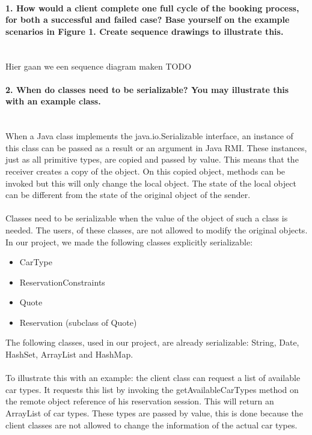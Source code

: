 \documentclass{ds-report}
\begin{document}
	\maketitle

	\paragraph{1. How would a client complete one full cycle of the booking process, for both a successful and
failed case? Base yourself on the example scenarios in Figure 1. Create sequence drawings to
illustrate this.} \mbox{}\\
	Hier gaan we een sequence diagram maken TODO
	
	\paragraph{2. When do classes need to be serializable? You may illustrate this with an example class.} \mbox{}\\
When a Java class implements the java.io.Serializable interface, an instance of this class can be passed as a result or an argument in Java RMI. These instances, just as all primitive types, are copied and passed by value. This means that the receiver creates a copy of the object. On this copied object, methods can be invoked but this will only change the local object. The state of the local object can be different from the state of the original object of the sender. \\\\
Classes need to be serializable when the value of the object of such a class is needed. The users, of these classes, are not allowed to modify the original objects. In our project, we made the following classes explicitly serializable:
\begin{itemize}
	\item CarType 
	\item ReservationConstraints 
	\item Quote
	\item Reservation (subclass of Quote)
\end{itemize}
The following classes, used in our project, are already serializable: String, Date, HashSet, ArrayList and HashMap.\\\\
To illustrate this with an example: the client class can request a list of available car types. It requests this list by invoking the getAvailableCarTypes method on the remote object reference of his reservation session. This will return an ArrayList of car types. These types are passed by value, this is done because the client classes are not allowed to change the information of the actual car types.
\end{document}
